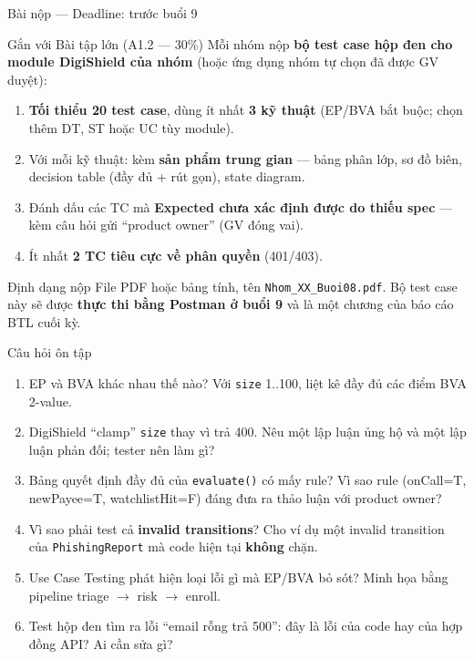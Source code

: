 \documentclass[aspectratio=169,12pt]{beamer}
\begin{document}
\begin{frame}[shrink=6]{Bài nộp --- Deadline: trước buổi 9}
  \begin{block}{Gắn với Bài tập lớn (A1.2 --- 30\%)}
    \small
    Mỗi nhóm nộp \textbf{bộ test case hộp đen cho module DigiShield của nhóm}
    (hoặc ứng dụng nhóm tự chọn đã được GV duyệt):
    \begin{enumerate}
      \item \textbf{Tối thiểu 20 test case}, dùng ít nhất \textbf{3 kỹ thuật}
        (EP/BVA bắt buộc; chọn thêm DT, ST hoặc UC tùy module).
      \item Với mỗi kỹ thuật: kèm \textbf{sản phẩm trung gian} --- bảng phân lớp,
        sơ đồ biên, decision table (đầy đủ + rút gọn), state diagram.
      \item Đánh dấu các TC mà \textbf{Expected chưa xác định được do thiếu spec}
        --- kèm câu hỏi gửi ``product owner'' (GV đóng vai).
      \item Ít nhất \textbf{2 TC tiêu cực về phân quyền} (401/403).
    \end{enumerate}
  \end{block}

  \vspace{0.1em}
  \begin{alertblock}{Định dạng nộp}
    \small File PDF hoặc bảng tính, tên \texttt{Nhom\_XX\_Buoi08.pdf}.
    Bộ test case này sẽ được \textbf{thực thi bằng Postman ở buổi 9} và là
    một chương của báo cáo BTL cuối kỳ.
  \end{alertblock}
\end{frame}

\begin{frame}{Câu hỏi ôn tập}
  \begin{enumerate}
    \item EP và BVA khác nhau thế nào? Với \texttt{size} 1..100, liệt kê đầy đủ
      các điểm BVA 2-value.
    \item DigiShield ``clamp'' \texttt{size} thay vì trả 400. Nêu một lập luận
      ủng hộ và một lập luận phản đối; tester nên làm gì?
    \item Bảng quyết định đầy đủ của \texttt{evaluate()} có mấy rule?
      Vì sao rule (onCall=T, newPayee=T, watchlistHit=F) đáng đưa ra
      thảo luận với product owner?
    \item Vì sao phải test cả \textbf{invalid transitions}? Cho ví dụ một
      invalid transition của \texttt{PhishingReport} mà code hiện tại
      \textbf{không} chặn.
    \item Use Case Testing phát hiện loại lỗi gì mà EP/BVA bỏ sót?
      Minh họa bằng pipeline triage $\to$ risk $\to$ enroll.
    \item Test hộp đen tìm ra lỗi ``email rỗng trả 500'': đây là lỗi của code
      hay của hợp đồng API? Ai cần sửa gì?
  \end{enumerate}
\end{frame}
\end{document}
